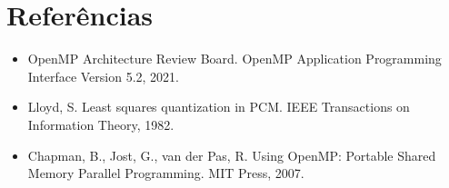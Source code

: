 \documentclass[12pt,a4paper]{article}
\begin{document}
\section{Referências}

\begin{itemize}
    \item OpenMP Architecture Review Board. OpenMP Application Programming Interface Version 5.2, 2021.
    \item Lloyd, S. Least squares quantization in PCM. IEEE Transactions on Information Theory, 1982.
    \item Chapman, B., Jost, G., van der Pas, R. Using OpenMP: Portable Shared Memory Parallel Programming. MIT Press, 2007.
\end{itemize}
\end{document}
